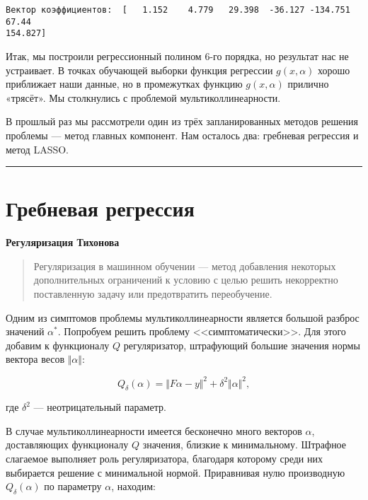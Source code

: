 \documentclass[11pt,a4paper]{article}
\begin{document}
    \begin{Verbatim}[commandchars=\\\{\}]
Вектор коэффициентов:  [   1.152    4.779   29.398  -36.127 -134.751   67.44
154.827]
    \end{Verbatim}

    Итак, мы построили регрессионный полином 6-го порядка, но результат нас
не устраивает. В точках обучающей выборки функция регрессии
\(g(x, \alpha)\) хорошо приближает наши данные, но в промежутках функцию
\(g(x, \alpha)\) прилично «трясёт». Мы столкнулись с проблемой
мультиколлинеарности.

В прошлый раз мы рассмотрели один из трёх запланированных методов решения
проблемы --- метод главных компонент.
Нам осталось два: гребневая регрессия и метод LASSO.

    \begin{center}\rule{0.5\linewidth}{0.5pt}\end{center}

    \hypertarget{ux433ux440ux435ux431ux43dux435ux432ux430ux44f-ux440ux435ux433ux440ux435ux441ux441ux438ux44f}{%
\section{Гребневая
регрессия}\label{ux433ux440ux435ux431ux43dux435ux432ux430ux44f-ux440ux435ux433ux440ux435ux441ux441ux438ux44f}}

\textbf{Регуляризация Тихонова}

\begin{quote}
Регуляризация в машинном обучении --- метод добавления некоторых
дополнительных ограничений к условию с целью решить некорректно
поставленную задачу или предотвратить переобучение.
\end{quote}

Одним из симптомов проблемы мультиколлинеарности является большой разброс значений \(\alpha^*\).
Попробуем решить проблему <<симптоматически>>.
Для этого добавим к функционалу \(Q\) регуляризатор, штрафующий большие значения нормы вектора весов \(\Vert \alpha \Vert\):

\[ Q_\delta(\alpha) = \Vert F\alpha - y \Vert^2 + \delta^2 \Vert \alpha \Vert^2, \]

где \(\delta^2\) --- неотрицательный параметр.

В случае мультиколлинеарности имеется бесконечно много векторов
\(\alpha\), доставляющих функционалу \(Q\) значения, близкие к
минимальному. Штрафное слагаемое выполняет роль регуляризатора,
благодаря которому среди них выбирается решение с минимальной нормой.
Приравнивая нулю производную \(Q_\delta (\alpha)\) по параметру
\(\alpha\), находим:
\end{document}
